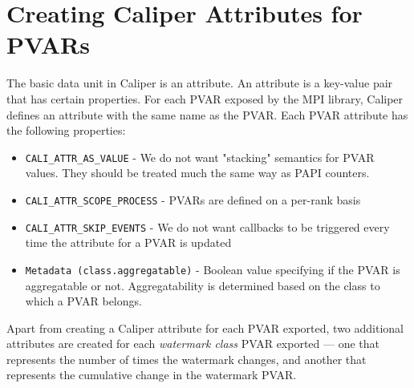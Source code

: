 \section{Creating Caliper Attributes for PVARs}
The basic data unit in Caliper is an attribute. An attribute is a key-value pair that has certain properties. For each PVAR exposed by the MPI library, Caliper defines an attribute with the same name as the PVAR. Each PVAR attribute has the following properties:
\begin{itemize}
	\item \verb+CALI_ATTR_AS_VALUE+ - We do not want "stacking" semantics for PVAR values. They should be treated much the same way as PAPI counters.
	\item \verb+CALI_ATTR_SCOPE_PROCESS+ - PVARs are defined on a per-rank basis
	\item \verb+CALI_ATTR_SKIP_EVENTS+ - We do not want callbacks to be triggered every time the attribute for a PVAR is updated
	\item \verb+Metadata (class.aggregatable)+ - Boolean value specifying if the PVAR is aggregatable or not. Aggregatability is determined based on the class to which a PVAR belongs. 
\end{itemize}
Apart from creating a Caliper attribute for each PVAR exported, two additional attributes are created for each \textit{watermark class} PVAR exported --- one that represents the number of times the watermark changes, and another that represents the cumulative change in the watermark PVAR.

